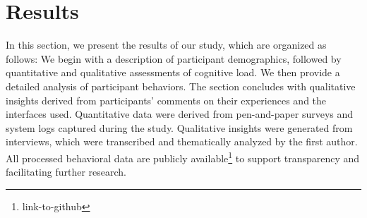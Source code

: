 \section{Results}
\label{sec:result}
In this section, we present the results of our study, which are organized as follows: We begin with a description of participant demographics, followed by quantitative and qualitative assessments of cognitive load. We then provide a detailed analysis of participant behaviors. The section concludes with qualitative insights derived from participants' comments on their experiences and the interfaces used. Quantitative data were derived from pen-and-paper surveys and system logs captured during the study. Qualitative insights were generated from interviews, which were transcribed and thematically analyzed by the first author. All processed behavioral data are publicly available\footnote{link-to-github} to support transparency and facilitating further research.

